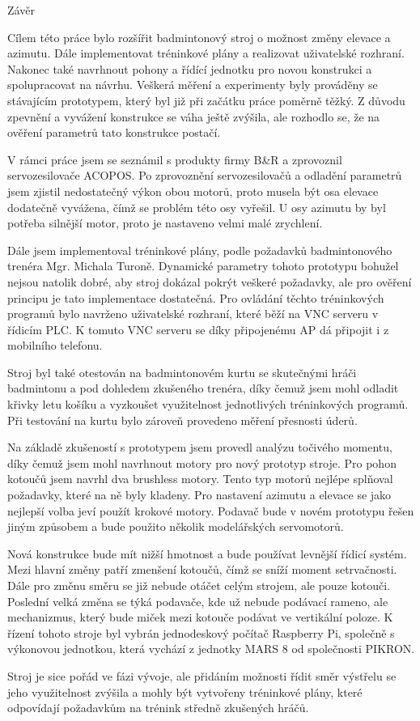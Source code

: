 \chap Závěr

Cílem této práce bylo rozšířit badmintonový stroj o možnost změny elevace a azimutu. Dále implementovat tréninkové plány a realizovat uživatelské rozhraní. Nakonec také navrhnout pohony a řídící jednotku pro novou konstrukci a spolupracovat na návrhu. Veškerá měření a experimenty byly prováděny se stávajícím prototypem, který byl již při začátku práce poměrně těžký. Z důvodu zpevnění a vyvážení konstrukce se váha ještě zvýšila, ale rozhodlo se, že na ověření parametrů tato konstrukce postačí.

V rámci práce jsem se seznámil s produkty firmy B\&R a zprovoznil servozesilovače ACOPOS. Po zprovoznění servozesilovačů a odladění parametrů jsem zjistil nedostatečný výkon obou motorů, proto musela být osa elevace dodatečně vyvážena, čímž se problém této osy vyřešil. U osy azimutu by byl potřeba silnější motor, proto je nastaveno velmi malé zrychlení. 

Dále jsem implementoval tréninkové plány, podle požadavků badmintonového trenéra Mgr. Michala Turoně. Dynamické parametry tohoto prototypu bohužel nejsou natolik dobré, aby stroj dokázal pokrýt veškeré požadavky, ale pro ověření principu je tato implementace dostatečná. Pro ovládání těchto tréninkových programů bylo navrženo uživatelské rozhraní, které běží na VNC serveru v řídicím PLC. K tomuto VNC serveru se díky připojenému AP dá připojit i z mobilního telefonu. 

Stroj byl také otestován na badmintonovém kurtu se skutečnými hráči badmintonu a pod dohledem zkušeného trenéra, díky čemuž jsem mohl odladit křivky letu košíku a vyzkoušet využitelnost jednotlivých tréninkových programů. Při testování na kurtu bylo zároveň provedeno měření přesnosti úderů.

Na základě zkušeností s prototypem jsem provedl analýzu točivého momentu, díky čemuž jsem mohl navrhnout motory pro nový prototyp stroje. Pro pohon kotoučů jsem navrhl dva brushless motory. Tento typ motorů nejlépe splňoval požadavky, které na ně byly kladeny. Pro nastavení azimutu a elevace se jako nejlepší volba jeví použít krokové motory. Podavač bude v novém prototypu řešen jiným způsobem a bude použito několik modelářských servomotorů.

Nová konstrukce bude mít nižší hmotnost a bude používat levnější řídicí systém. Mezi hlavní změny patří zmenšení kotoučů, čímž se sníží moment setrvačnosti. Dále pro změnu směru se již nebude otáčet celým strojem, ale pouze kotouči. Poslední velká změna se týká podavače, kde už nebude podávací rameno, ale mechanizmus, který bude miček mezi kotouče podávat ve vertikální poloze. K řízení tohoto stroje byl vybrán jednodeskový počítač Raspberry Pi, společně s výkonovou jednotkou, která vychází z jednotky MARS 8 od společnosti PIKRON.

Stroj je sice pořád ve fázi vývoje, ale přidáním možnosti řídit směr výstřelu se jeho využitelnost zvýšila a mohly být vytvořeny tréninkové plány, které odpovídají požadavkům na trénink středně zkušených hráčů.




